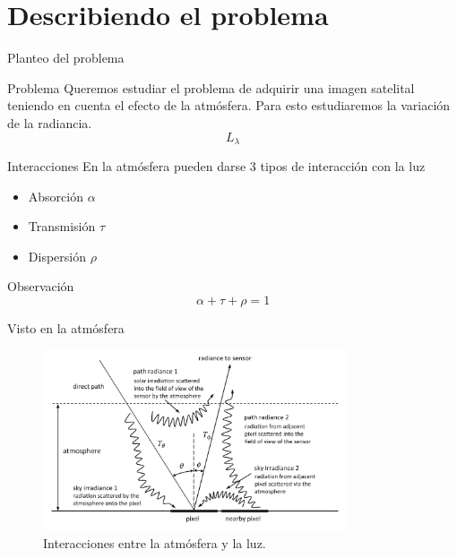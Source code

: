 \documentclass[]{beamer}
\begin{document}
\section{Describiendo el problema}

\begin{frame}{Planteo del problema}
  \begin{block}{Problema}
    Queremos estudiar el problema de adquirir una imagen satelital teniendo en cuenta el efecto de la atmósfera.\pause
    Para esto estudiaremos la variación de la radiancia.
    $$L_\lambda$$
  \end{block}
\end{frame}

\begin{frame}{Interacciones}
  En la atmósfera pueden darse 3 tipos de interacción con la luz\pause
    \begin{itemize}[<+->]
      \item Absorción $\alpha$
      \item Transmisión $\tau$
      \item Dispersión $\rho$
    \end{itemize}\pause
    \begin{block}{Observación}
      \begin{equation}
        \alpha + \tau + \rho = 1
      \end{equation}
    \end{block}
\end{frame}

\begin{frame}{Visto en la atmósfera}
  \begin{figure}
  \centering
  \includegraphics[width=0.8\textwidth]{imagenes/iatmo.png}
  \caption{Interacciones entre la atmósfera y la luz.}
  \end{figure}
\end{frame}
\end{document}
